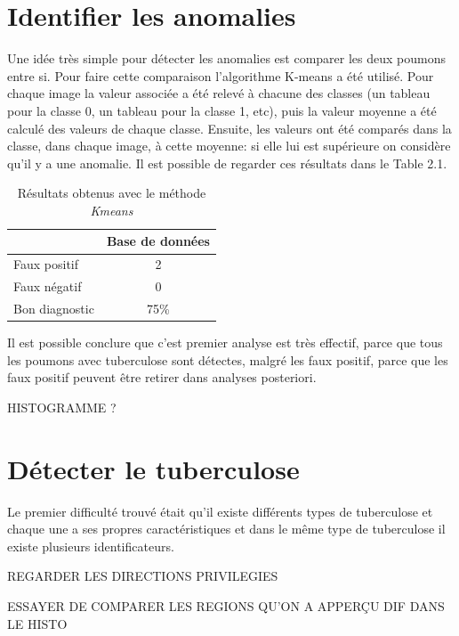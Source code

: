 \documentclass[a4paper,12pt]{report}
\begin{document}
 \pagebreak
 
\section{Identifier les anomalies}
Une idée très simple pour détecter les anomalies est comparer les deux poumons entre si. Pour faire cette comparaison  l'algorithme K-means a été utilisé. 
  Pour  chaque  image  la  valeur  associée  a été relevé à  chacune  des 
classes  (un  tableau  pour  la  classe  0,  un  tableau  pour  la  classe  1,  etc),  puis  la  valeur  moyenne a été calculé  des  valeurs  de  chaque classe.  Ensuite,  les valeurs ont été comparés  dans  la  classe,  dans  chaque  image,  à  cette  moyenne:  si  elle  lui  est  supérieure  on considère qu’il y a une anomalie. Il est possible de regarder ces résultats dans le Table 2.1.

\begin{table}[h]
	\centering

	\label{my-label}
	\begin{tabular}{llll|c|l|l|l|l|}
		\cline{5-9}
		&     &     &     & \multicolumn{5}{c|}{Base de données} \\ \hline
		\multicolumn{4}{|l|}{Faux positif} & \multicolumn{5}{c|}{2} \\ \hline
		\multicolumn{4}{|l|}{Faux négatif} & \multicolumn{5}{c|}{0} \\ \hline
		\multicolumn{4}{|l|}{Bon diagnostic} & \multicolumn{5}{c|}{75\%} \\ \hline
	\end{tabular}
	\caption{Résultats obtenus avec le méthode \textit{Kmeans}}
	\end{table}

Il est possible conclure que c'est premier analyse est très effectif, parce que tous les poumons avec tuberculose sont détectes, malgré les faux positif, parce que les faux positif peuvent être retirer dans analyses posteriori.

 HISTOGRAMME ?
\section{Détecter le tuberculose}
 Le premier difficulté trouvé était qu'il existe différents types de tuberculose et chaque une a ses propres caractéristiques et dans le même type de tuberculose il existe plusieurs identificateurs.
 
 REGARDER LES DIRECTIONS PRIVILEGIES
 
 ESSAYER DE COMPARER LES REGIONS QU'ON A APPERÇU DIF DANS LE HISTO
 
\end{document}

